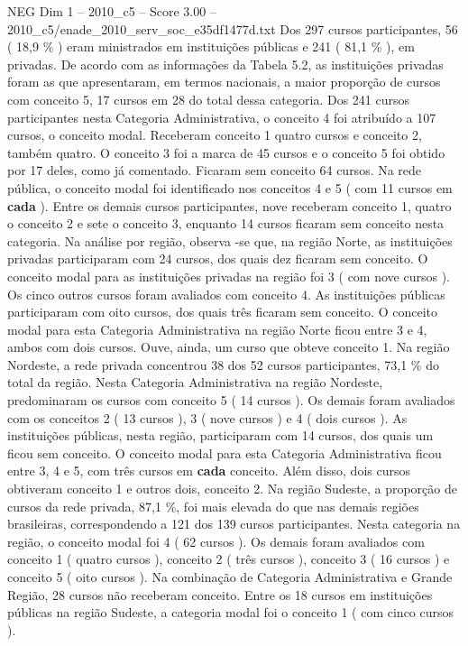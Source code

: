 \begin{textsample}{NEG Dim 1 – 2010\_c5 – Score 3.00 – 2010\_c5/enade\_2010\_serv\_soc\_e35df1477d.txt}
Dos 297 cursos participantes, 56 ( 18,9 \% ) eram ministrados em instituições públicas e 241 ( 81,1 \% ), em privadas.
De acordo com as informações da Tabela 5.2, as instituições privadas foram as que apresentaram, em termos nacionais, a maior proporção de cursos com conceito 5, 17 cursos em 28 do total dessa categoria.
Dos 241 cursos participantes nesta Categoria Administrativa, o conceito 4 foi atribuído a 107 cursos, o conceito modal.
Receberam conceito 1 quatro cursos e conceito 2, também quatro.
O conceito 3 foi a marca de 45 cursos e o conceito 5 foi obtido por 17 deles, como já comentado.
Ficaram sem conceito 64 cursos.
Na rede pública, o conceito modal foi identificado nos conceitos 4 e 5 ( com 11 cursos em \textbf{cada} ).
Entre os demais cursos participantes, nove receberam conceito 1, quatro o conceito 2 e sete o conceito 3, enquanto 14 cursos ficaram sem conceito nesta categoria.
Na análise por região, observa -se que, na região Norte, as instituições privadas participaram com 24 cursos, dos quais dez ficaram sem conceito.
O conceito modal para as instituições privadas na região foi 3 ( com nove cursos ).
Os cinco outros cursos foram avaliados com conceito 4.
As instituições públicas participaram com oito cursos, dos quais três ficaram sem conceito.
O conceito modal para esta Categoria Administrativa na região Norte ficou entre 3 e 4, ambos com dois cursos.
Ouve, ainda, um curso que obteve conceito 1.
Na região Nordeste, a rede privada concentrou 38 dos 52 cursos participantes, 73,1 \% do total da região.
Nesta Categoria Administrativa na região Nordeste, predominaram os cursos com conceito 5 ( 14 cursos ).
Os demais foram avaliados com os conceitos 2 ( 13 cursos ), 3 ( nove cursos ) e 4 ( dois cursos ).
As instituições públicas, nesta região, participaram com 14 cursos, dos quais um ficou sem conceito.
O conceito modal para esta Categoria Administrativa ficou entre 3, 4 e 5, com três cursos em \textbf{cada} conceito.
Além disso, dois cursos obtiveram conceito 1 e outros dois, conceito 2.
Na região Sudeste, a proporção de cursos da rede privada, 87,1 \%, foi mais elevada do que nas demais regiões brasileiras, correspondendo a 121 dos 139 cursos participantes.
Nesta categoria na região, o conceito modal foi 4 ( 62 cursos ).
Os demais foram avaliados com conceito 1 ( quatro cursos ), conceito 2 ( três cursos ), conceito 3 ( 16 cursos ) e conceito 5 ( oito cursos ).
Na combinação de Categoria Administrativa e Grande Região, 28 cursos não receberam conceito.
Entre os 18 cursos em instituições públicas na região Sudeste, a categoria modal foi o conceito 1 ( com cinco cursos ).

\end{textsample}
